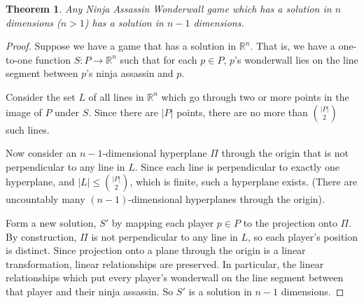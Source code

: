 \documentclass[12pt,x11names, rgb]{article}
\newtheorem*{thm}{Theorem}
\begin{document}
	\vspace{12pt}
    \begin{thm}
    Any Ninja Assassin Wonderwall game which has a solution in $n$ dimensions ($n > 1$) has a solution in $n-1$ dimensions.
    \end{thm}
    \begin{proof}
    Suppose we have a game that has a solution in $\mathbb{R}^n$. That is, we have a one-to-one function $S: P \to \mathbb{R}^n$ such that for each $p \in P$, $p$'s wonderwall lies on the line segment between $p$'s ninja assassin and $p$. 

    Consider the set $L$ of all lines in $\mathbb{R}^n$ which go through two or more points in the image of $P$ under $S$. Since there are $\lvert P \rvert$ points, there are no more than $\binom{ \lvert P \rvert}{2}$ such lines. 

    Now consider an $n-1$-dimensional hyperplane $\Pi$ through the origin that is not perpendicular to any line in $L$. Since each line is perpendicular to exactly one hyperplane, and $\lvert L \rvert \leq \binom{\lvert P \rvert}{2}$, which is finite, such a hyperplane exists. (There are uncountably many $(n-1)$-dimensional hyperplanes through the origin).

    Form a new solution, $S'$ by mapping each player $p\in P$ to the projection onto $\Pi$. By construction, $\Pi$ is not perpendicular to any line in $L$, so each player's position is distinct. Since projection onto a plane through the origin is a linear transformation, linear relationships are preserved. In particular, the linear relationships which put every player's wonderwall on the line segment between that player and their ninja assassin. So $S'$ is a solution in $n-1$ dimensions.
    \end{proof}
\end{document}
